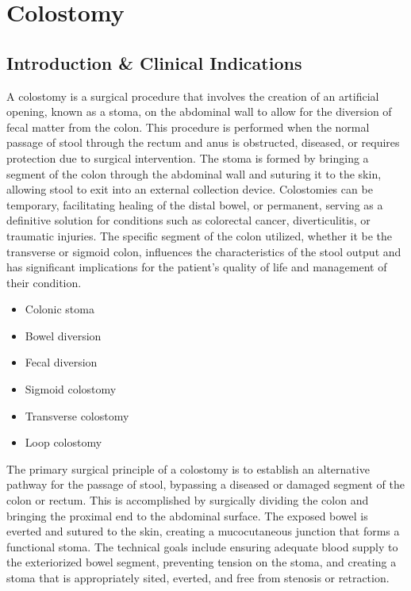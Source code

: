\chapter{Colostomy}

\section*{Introduction \& Clinical Indications}
A colostomy is a surgical procedure that involves the creation of an artificial opening, known as a stoma, on the abdominal wall to allow for the diversion of fecal matter from the colon. This procedure is performed when the normal passage of stool through the rectum and anus is obstructed, diseased, or requires protection due to surgical intervention. The stoma is formed by bringing a segment of the colon through the abdominal wall and suturing it to the skin, allowing stool to exit into an external collection device. Colostomies can be temporary, facilitating healing of the distal bowel, or permanent, serving as a definitive solution for conditions such as colorectal cancer, diverticulitis, or traumatic injuries. The specific segment of the colon utilized, whether it be the transverse or sigmoid colon, influences the characteristics of the stool output and has significant implications for the patient's quality of life and management of their condition.

\begin{itemize}
  \item Colonic stoma
  \item Bowel diversion
  \item Fecal diversion
  \item Sigmoid colostomy
  \item Transverse colostomy
  \item Loop colostomy
\end{itemize}

The primary surgical principle of a colostomy is to establish an alternative pathway for the passage of stool, bypassing a diseased or damaged segment of the colon or rectum. This is accomplished by surgically dividing the colon and bringing the proximal end to the abdominal surface. The exposed bowel is everted and sutured to the skin, creating a mucocutaneous junction that forms a functional stoma. The technical goals include ensuring adequate blood supply to the exteriorized bowel segment, preventing tension on the stoma, and creating a stoma that is appropriately sited, everted, and free from stenosis or retraction.

